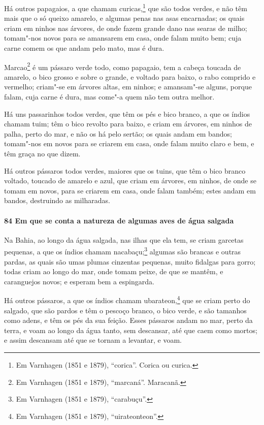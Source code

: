 Há outros papagaios, a que chamam curicas,\footnote{ Em Varnhagen (1851 e 1879),
``corica''. Corica ou curica.} que são todos verdes, e não têm mais que o só queixo
amarelo, e algumas penas nas asas encarnadas; os quais criam em ninhos nas árvores, de
onde fazem grande dano nas searas de milho; tomam"-nos novos para se amansarem em casa,
onde falam muito bem; cuja carne comem os que andam pelo mato, mas é dura.

Marcao\footnote{ Em Varnhagen (1851 e 1879), ``marcaná''. Maracanã.} é um pássaro verde
todo, como papagaio, tem a cabeça toucada de amarelo, o bico grosso e sobre o grande, e
voltado para baixo, o rabo comprido e vermelho; criam"-se em árvores altas, em ninhos; e
amansam"-se alguns, porque falam, cuja carne é dura, mas come"-a quem não tem outra melhor.

Há uns passarinhos todos verdes, que têm os pés e bico branco, a que os índios chamam
tuim; têm o bico revolto para baixo, e criam em árvores, em ninhos de palha, perto do mar,
e não os há pelo sertão; os quais andam em bandos; tomam"-nos em novos para se criarem em
casa, onde falam muito claro e bem, e têm graça no que dizem.

Há outros pássaros todos verdes, maiores que os tuins, que têm o bico branco voltado,
toucado de amarelo e azul, que criam em árvores, em ninhos, de onde se tomam em novos,
para se criarem em casa, onde falam também; estes andam em bandos, destruindo as
milharadas.

\paragraph{84 Em que se conta a natureza de algumas aves de água salgada}

Na Bahia, ao longo da água salgada, nas ilhas que ela tem, se criam garcetas pequenas, a
que os índios chamam nacabaçu;\footnote{ Em Varnhagen (1851 e 1879), ``carabuçu''.}
algumas são brancas e outras pardas, as quais são umas plumas cinzentas pequenas, muito
fidalgas para gorro; todas criam ao longo do mar, onde tomam peixe, de que se mantêm, e
caranguejos novos; e esperam bem a espingarda.

Há outros pássaros, a que os índios chamam ubarateon,\footnote{ Em Varnhagen (1851 e 1879),
``uirateonteon''.} que se criam perto do salgado, que são pardos e têm o pescoço branco,
o bico verde, e são tamanhos como adens, e têm os pés da sua feição. Esses pássaros andam
no mar, perto da terra, e voam ao longo da água tanto, sem descansar, até que caem como
mortos; e assim descansam até que se tornam a levantar, e voam.

